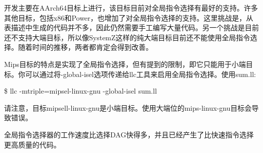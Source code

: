 开发主要在AArch64目标上进行，该目标目前对全局指令选择有最好的支持。许多其他目标，包括x86和Power，也增加了对全局指令选择的支持。这里挑战是，从表描述中生成的代码并不多，因此仍然需要手工编写大量代码。另一个挑战是目前还不支持大端目标，所以像SystemZ这样的纯大端目标目前还不能使用全局指令选择。随着时间的推移，两者都肯定会得到改善。\par

Mips目标的特点是实现了全局指令选择，但有提到的限制，即它只能用于小端目标。你可以通过将-global-isel选项传递给llc工具来启用全局指令选择。使用sum.ll:\par

\begin{tcolorbox}[colback=white,colframe=black]
\$ llc -mtriple=mipsel-linux-gnu -global-isel sum.ll
\end{tcolorbox}

请注意，目标mipsell-linux-gnu是小端目标。使用大端位的mips-linux-gnu目标会导致错误。\par

全局指令选择器的工作速度比选择DAG快得多，并且已经产生了比快速指令选择更高质量的代码。\par









